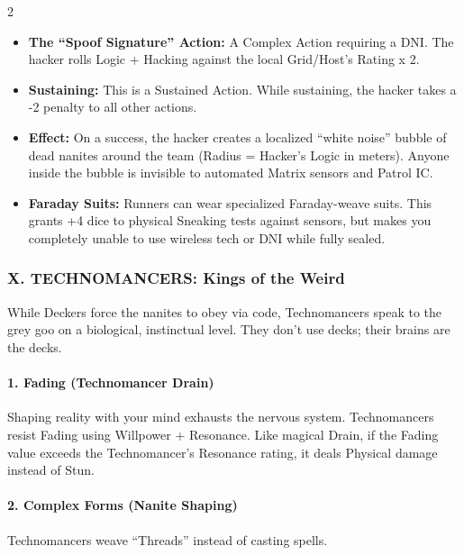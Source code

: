 \documentclass[
  oneside]{article}
\providecommand{\tightlist}{%
  \setlength{\itemsep}{0pt}\setlength{\parskip}{0pt}}
\begin{document}
\begin{multicols}{2}
\begin{itemize}
\tightlist
\item
  \textbf{The ``Spoof Signature'' Action:} A
  Complex Action requiring a DNI. The hacker rolls
  Logic + Hacking against the local Grid/Host's
  Rating x 2.
\item
  \textbf{Sustaining:} This is a Sustained Action.
  While sustaining, the hacker takes a -2 penalty
  to all other actions.
\item
  \textbf{Effect:} On a success, the hacker
  creates a localized ``white noise'' bubble of
  dead nanites around the team (Radius = Hacker's
  Logic in meters). Anyone inside the bubble is
  invisible to automated Matrix sensors and Patrol
  IC.
\item
  \textbf{Faraday Suits:} Runners can wear
  specialized Faraday-weave suits. This grants +4
  dice to physical Sneaking tests against sensors,
  but makes you completely unable to use wireless
  tech or DNI while fully sealed.
\end{itemize}

\hypertarget{x.-technomancers-kings-of-the-weird}{%
\subsubsection{X. TECHNOMANCERS: Kings of the
Weird}\label{x.-technomancers-kings-of-the-weird}}

While Deckers force the nanites to obey via code,
Technomancers speak to the grey goo on a
biological, instinctual level. They don't use
decks; their brains are the decks.

\hypertarget{fading-technomancer-drain}{%
\paragraph{1. Fading (Technomancer
Drain)}\label{fading-technomancer-drain}}

Shaping reality with your mind exhausts the
nervous system. Technomancers resist Fading using
Willpower + Resonance. Like magical Drain, if the
Fading value exceeds the Technomancer's Resonance
rating, it deals Physical damage instead of Stun.

\hypertarget{complex-forms-nanite-shaping}{%
\paragraph{2. Complex Forms (Nanite
Shaping)}\label{complex-forms-nanite-shaping}}

Technomancers weave ``Threads'' instead of casting
spells.

\end{multicols}
\end{document}
